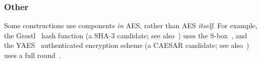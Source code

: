 \subsubsection{Other}

Some constructions use components {\em in} AES, rather than AES {\em itself}.
For example,
the Gr{\o}stl~\cite{GKMMRST:11} hash function
(a SHA-3  candidate; see also~\cite{BBGR:09})
uses the S-box~\cite[Section 4.3]{GKMMRST:11},
and
the YAES~\cite{BosVer:14} authenticated encryption scheme
(a CAESAR candidate; see also~\cite[Section 4.1]{AnkAnk:16})
uses a full round~\cite[Section 1.3]{BosVer:14}.

